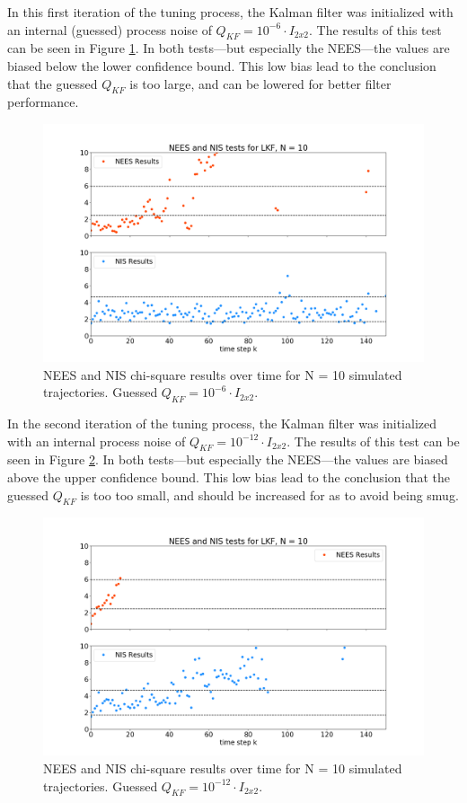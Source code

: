 \documentclass[11pt, a4paper]{article}
\begin{document}
In this first iteration of the tuning process, the Kalman filter was initialized with an internal (guessed) process noise of $Q_{KF} = 10^{-6} \cdot I_{2 x 2}$. 
The results of this test can be seen in Figure \ref{fig:neesnis_lkf_Qbig}. 
In both tests---but especially the NEES---the values are biased below the lower confidence bound. 
This low bias lead to the conclusion that the guessed $Q_{KF}$ is too large, and can be lowered for better filter performance. 
\begin{figure}[H]
	\centering
	\includegraphics[width=\textwidth]{Figures/NEESNIS_lkf_N10Q1.0E-06.png}
	\caption{NEES and NIS chi-square results over time for N = 10 simulated trajectories. Guessed $Q_{KF} = 10^{-6} \cdot I_{2 x 2}$.}
	\label{fig:neesnis_lkf_Qbig}
\end{figure}

In the second iteration of the tuning process, the Kalman filter was initialized with an internal process noise of $Q_{KF} = 10^{-12} \cdot I_{2 x 2}$. 
The results of this test can be seen in Figure \ref{fig:neesnis_lkf_Qsmall}. 
In both tests---but especially the NEES---the values are biased above the upper confidence bound. 
This low bias lead to the conclusion that the guessed $Q_{KF}$ is too too small, and should be increased for as to avoid being smug. 
\begin{figure}[H]
	\centering
	\includegraphics[width=\textwidth]{Figures/NEESNIS_lkf_N10Q1.0E-12.png}
	\caption{NEES and NIS chi-square results over time for N = 10 simulated trajectories. Guessed $Q_{KF} = 10^{-12} \cdot I_{2 x 2}$.}
	\label{fig:neesnis_lkf_Qsmall}
\end{figure}
\end{document}
